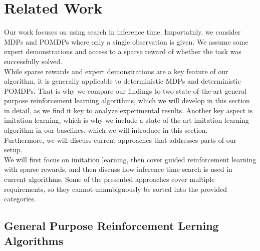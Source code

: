 
\chapter{Related Work}
\label{chapter:RelWork}
Our work focuses on using search in inference time. Importatnly, we consider MDPs and POMDPs where only a single observation is given. 
We assume some expert demonstrations and access to a sparse
reward of whether the task was successfully solved. \\
While sparse rewards and expert demonstrations are a key feature of our algorithm, it is generally applicable to deterministic MDPs and deterministic POMDPs. That is why we compare our 
findings to two state-of-the-art general purpose reinforcement learning algorithms, which we will develop in this section in detail, as we find it key to analyze experimental results. 
Another key aspect is imitation learning, which is why we include a state-of-the-art imitation learning algorithm in our baselines, which we will introduce in this section. \\

Furthermore, we will discuss current approaches that addresses parts of our setup. \\
We will first focus on imitation learning, then cover guided reinforcement learning with sparse rewards, and then
discuss how inference time search is used in current algorithms. Some of the presented approaches cover multiple requirements, so they cannot unambiguously be sorted into the provided categories.

\section{General Purpose Reinforcement Lerning Algorithms}

